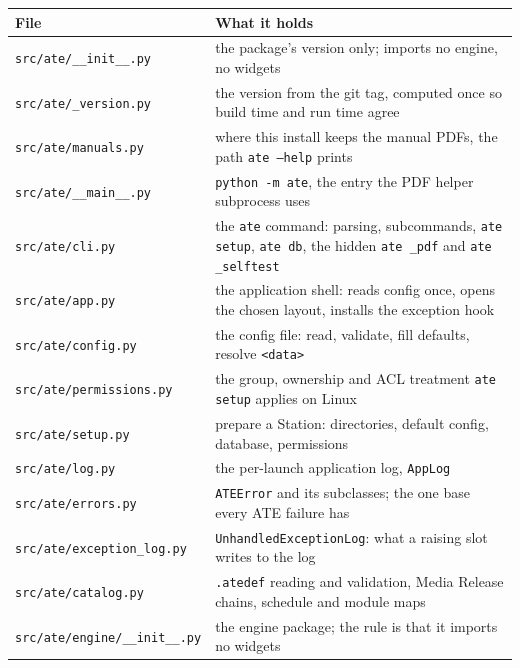 \begingroup\small
\begin{longtable}{p{5.6cm} p{9.4cm}}
\toprule
\textbf{File} & \textbf{What it holds} \\
\midrule
\endhead
\texttt{src/\allowbreak{}ate/\allowbreak\_\allowbreak\_\allowbreak{}init\_\allowbreak\_\allowbreak.py} & the package's version only; imports no engine, no widgets \\
\texttt{src/ate/\_version.py} & the version from the git tag, computed once so build time and run time agree \\
\texttt{src/ate/manuals.py} & where this install keeps the manual PDFs, the path \texttt{ate --help} prints \\
\texttt{src/\allowbreak{}ate/\allowbreak\_\allowbreak\_\allowbreak{}main\_\allowbreak\_\allowbreak.py} & \texttt{python -m ate}, the entry the PDF helper subprocess uses \\
\texttt{src/ate/cli.py} & the \texttt{ate} command: parsing, subcommands, \texttt{ate setup}, \texttt{ate db}, the hidden \texttt{ate \_pdf} and \texttt{ate \_selftest} \\
\texttt{src/ate/app.py} & the application shell: reads config once, opens the chosen layout, installs the exception hook \\
\texttt{src/ate/config.py} & the config file: read, validate, fill defaults, resolve \texttt{<data>} \\
\texttt{src/\allowbreak{}ate/\allowbreak{}permissions.py} & the group, ownership and ACL treatment \texttt{ate setup} applies on Linux \\
\texttt{src/ate/setup.py} & prepare a Station: directories, default config, database, permissions \\
\texttt{src/ate/log.py} & the per-launch application log, \texttt{AppLog} \\
\texttt{src/ate/errors.py} & \texttt{ATEError} and its subclasses; the one base every ATE failure has \\
\texttt{src/\allowbreak{}ate/\allowbreak{}exception\_\allowbreak{}log.py} & \texttt{UnhandledExceptionLog}: what a raising slot writes to the log \\
\texttt{src/ate/catalog.py} & \texttt{.atedef} reading and validation, Media Release chains, schedule and module maps \\
\texttt{src/\allowbreak{}ate/\allowbreak{}engine/\allowbreak\_\allowbreak\_\allowbreak{}init\_\allowbreak\_\allowbreak.py} & the engine package; the rule is that it imports no widgets \\

\end{longtable}
